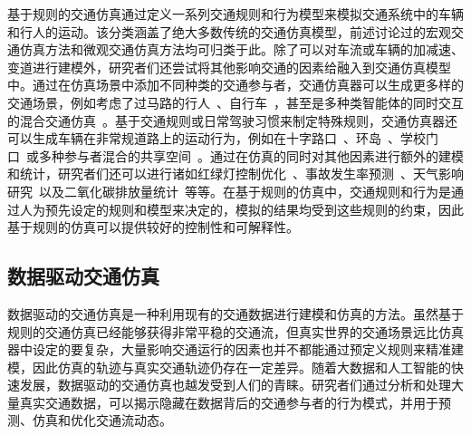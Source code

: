 基于规则的交通仿真通过定义一系列交通规则和行为模型来模拟交通系统中的车辆和行人的运动。该分类涵盖了绝大多数传统的交通仿真模型，前述讨论过的宏观交通仿真方法和微观交通仿真方法均可归类于此。除了可以对车流或车辆的加减速、变道进行建模外，研究者们还尝试将其他影响交通的因素给融入到交通仿真模型中。通过在仿真场景中添加不同种类的交通参与者，交通仿真器可以生成更多样的交通场景，例如考虑了过马路的行人~\cite{chao2015vehicle, ning2017destination, ningbo2017simulation, chen2019modelling, wang2018shadow}、自行车~\cite{qu2017modeling}，甚至是多种类智能体的同时交互的混合交通仿真~\cite{anvari2015modelling, chao2019force, cai2020summit}。基于交通规则或日常驾驶习惯来制定特殊规则，交通仿真器还可以生成车辆在非常规道路上的运动行为，例如在十字路口~\cite{cunto2007microlevel, 2015An}、环岛~\cite{campari2004cellular}、学校门口~\cite{pang2015school}或多种参与者混合的共享空间~\cite{anvari2015modelling}。通过在仿真的同时对其他因素进行额外的建模和统计，研究者们还可以进行诸如红绿灯控制优化~\cite{shen2011agent, mckenney2013distributed, zhao2018signal}、事故发生率预测~\cite{cunto2007microlevel}、天气影响研究~\cite{chen2019assessing}以及二氧化碳排放量统计~\cite{quaassdorff2016microscale}等等。在基于规则的仿真中，交通规则和行为是通过人为预先设定的规则和模型来决定的，模拟的结果均受到这些规则的约束，因此基于规则的仿真可以提供较好的控制性和可解释性。






\subsection{数据驱动交通仿真}

数据驱动的交通仿真是一种利用现有的交通数据进行建模和仿真的方法。虽然基于规则的交通仿真已经能够获得非常平稳的交通流，但真实世界的交通场景远比仿真器中设定的要复杂，大量影响交通运行的因素也并不都能通过预定义规则来精准建模，因此仿真的轨迹与真实交通轨迹仍存在一定差异。随着大数据和人工智能的快速发展，数据驱动的交通仿真也越发受到人们的青睐。研究者们通过分析和处理大量真实交通数据，可以揭示隐藏在数据背后的交通参与者的行为模式，并用于预测、仿真和优化交通流动态。

